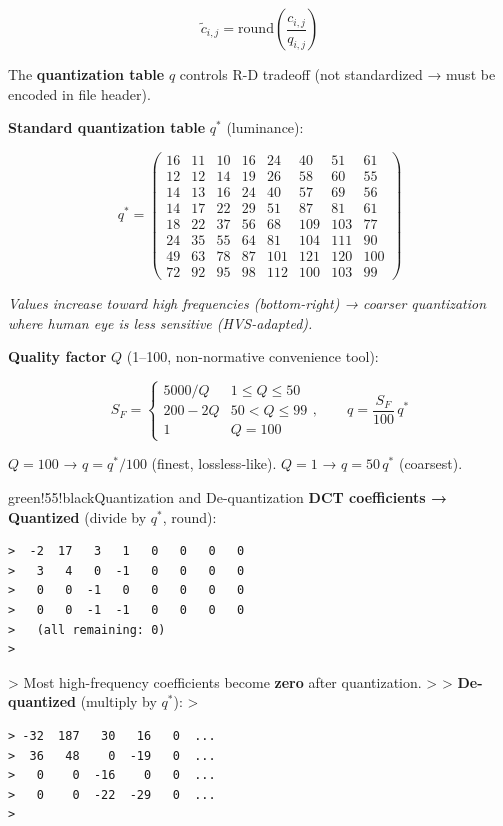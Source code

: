 \[
\tilde{c}_{i,j} = \text{round}\!\left(\frac{c_{i,j}}{q_{i,j}}\right)
\]

The \textbf{quantization table} $q$ controls R-D tradeoff (not standardized → must be encoded in file header).

\textbf{Standard quantization table} $q^*$ (luminance):

\[
q^* = \begin{pmatrix}
16 & 11 & 10 & 16 & 24 & 40 & 51 & 61 \\
12 & 12 & 14 & 19 & 26 & 58 & 60 & 55 \\
14 & 13 & 16 & 24 & 40 & 57 & 69 & 56 \\
14 & 17 & 22 & 29 & 51 & 87 & 81 & 61 \\
18 & 22 & 37 & 56 & 68 & 109 & 103 & 77 \\
24 & 35 & 55 & 64 & 81 & 104 & 111 & 90 \\
49 & 63 & 78 & 87 & 101 & 121 & 120 & 100 \\
72 & 92 & 95 & 98 & 112 & 100 & 103 & 99
\end{pmatrix}
\]

\textit{Values increase toward high frequencies (bottom-right) → coarser quantization where human eye is less sensitive (HVS-adapted).}

\textbf{Quality factor} $Q$ (1–100, non-normative convenience tool):

\[
S_F = \begin{cases} 5000/Q & 1 \leq Q \leq 50 \\ 200-2Q & 50 < Q \leq 99 \\ 1 & Q=100 \end{cases}, \qquad q = \frac{S_F}{100}\, q^*
\]

$Q=100$ → $q = q^*/100$ (finest, lossless-like). $Q=1$ → $q=50\,q^*$ (coarsest).

\begin{calloutbox}{green!55!black}{Quantization and De-quantization}
\textbf{DCT coefficients → Quantized} (divide by $q^*$, round):

\end{calloutbox}
\begin{verbatim}
>  -2  17   3   1   0   0   0   0
>   3   4   0  -1   0   0   0   0
>   0   0  -1   0   0   0   0   0
>   0   0  -1  -1   0   0   0   0
>   (all remaining: 0)
> 
\end{verbatim}

\textgreater{} Most high-frequency coefficients become \textbf{zero} after quantization.
\textgreater{}
\textgreater{} \textbf{De-quantized} (multiply by $q^*$):
\textgreater{}
\begin{verbatim}
> -32  187   30   16   0  ...
>  36   48    0  -19   0  ...
>   0    0  -16    0   0  ...
>   0    0  -22  -29   0  ...
> 
\end{verbatim}

